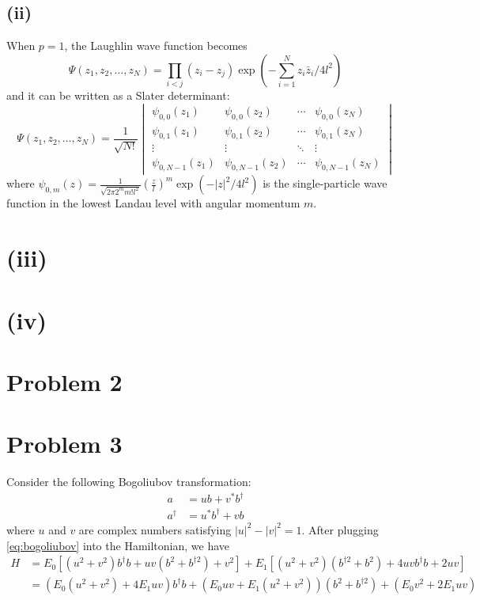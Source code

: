 \documentclass{article}
\begin{document}
\subsection*{(ii)}
When $p=1$, the Laughlin wave function becomes
\begin{equation}
    \Psi(z_1,z_2,\ldots,z_N)=\prod_{i<j}(z_i-z_j)\exp\left(-\sum_{i=1}^Nz_i \bar{z}_i/4l^2\right)
\end{equation}
and it can be written as a Slater determinant:
\begin{equation}
    \Psi(z_1,z_2,\ldots,z_N)=\frac{1}{\sqrt{N!}}\begin{vmatrix}
        \psi_{0,0}(z_1) & \psi_{0,0}(z_2) & \cdots & \psi_{0,0}(z_N)\\
        \psi_{0,1}(z_1) & \psi_{0,1}(z_2) & \cdots & \psi_{0,1}(z_N)\\
        \vdots & \vdots & \ddots & \vdots\\
        \psi_{0,N-1}(z_1) & \psi_{0,N-1}(z_2) & \cdots & \psi_{0,N-1}(z_N)
    \end{vmatrix}
\end{equation}
where $\psi_{0,m}(z)=\frac{1}{\sqrt{2\pi 2^m m! l^{2}}}\left(\frac{z}{l}\right)^m\exp(-|z|^2/4l^2)$ is the single-particle wave function in the lowest Landau level with angular momentum $m$.

\section*{(iii)}

\section*{(iv)}

\section*{Problem 2}


\section*{Problem 3}
Consider the following Bogoliubov transformation:
\begin{subequations}\label{eq:bogoliubov}
    \begin{align}
        a&=ub+v^*b^\dagger\\
        a^\dagger&=u^*b^\dagger+vb
    \end{align}
\end{subequations}
where $u$ and $v$ are complex numbers satisfying $|u|^2-|v|^2=1$.
After plugging \cref{eq:bogoliubov} into the Hamiltonian, we have
\begin{equation}
    \begin{split}
        H&=E_0\left[(u^2+v^2)b^\dagger b+uv(b^2+b^{\dagger 2})+v^2\right]+E_1\left[(u^2+v^2)(b^{\dagger 2}+b^2)+4uvb^\dagger b+2uv\right]\\
         &= (E_0(u^2+v^2)+4E_1uv)b^\dagger b+(E_0uv+E_1(u^2+v^2))(b^2+b^{\dagger 2})+(E_0v^2+2E_1uv)
    \end{split}
\end{equation}
\end{document}
